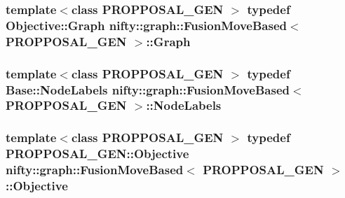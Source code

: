 \subsubsection[{Graph}]{\setlength{\rightskip}{0pt plus 5cm}template$<$class P\+R\+O\+P\+P\+O\+S\+A\+L\+\_\+\+G\+E\+N $>$ typedef Objective\+::\+Graph {\bf nifty\+::graph\+::\+Fusion\+Move\+Based}$<$ P\+R\+O\+P\+P\+O\+S\+A\+L\+\_\+\+G\+E\+N $>$\+::{\bf Graph}}\label{classnifty_1_1graph_1_1FusionMoveBased_a205de789ea5e0f76764b89abf2a49b3f}
\hypertarget{classnifty_1_1graph_1_1FusionMoveBased_a48c9960174a5a3e9c3bbe9756c7b4c22}{}
\subsubsection[{Node\+Labels}]{\setlength{\rightskip}{0pt plus 5cm}template$<$class P\+R\+O\+P\+P\+O\+S\+A\+L\+\_\+\+G\+E\+N $>$ typedef {\bf Base\+::\+Node\+Labels} {\bf nifty\+::graph\+::\+Fusion\+Move\+Based}$<$ P\+R\+O\+P\+P\+O\+S\+A\+L\+\_\+\+G\+E\+N $>$\+::{\bf Node\+Labels}}\label{classnifty_1_1graph_1_1FusionMoveBased_a48c9960174a5a3e9c3bbe9756c7b4c22}
\hypertarget{classnifty_1_1graph_1_1FusionMoveBased_afe9396032c919255647c24b46a54bee4}{}
\subsubsection[{Objective}]{\setlength{\rightskip}{0pt plus 5cm}template$<$class P\+R\+O\+P\+P\+O\+S\+A\+L\+\_\+\+G\+E\+N $>$ typedef P\+R\+O\+P\+P\+O\+S\+A\+L\+\_\+\+G\+E\+N\+::\+Objective {\bf nifty\+::graph\+::\+Fusion\+Move\+Based}$<$ P\+R\+O\+P\+P\+O\+S\+A\+L\+\_\+\+G\+E\+N $>$\+::{\bf Objective}}\label{classnifty_1_1graph_1_1FusionMoveBased_afe9396032c919255647c24b46a54bee4}
\hypertarget{classnifty_1_1graph_1_1FusionMoveBased_a65248a923769ebcbad4d92ba2d2f2150}{}
